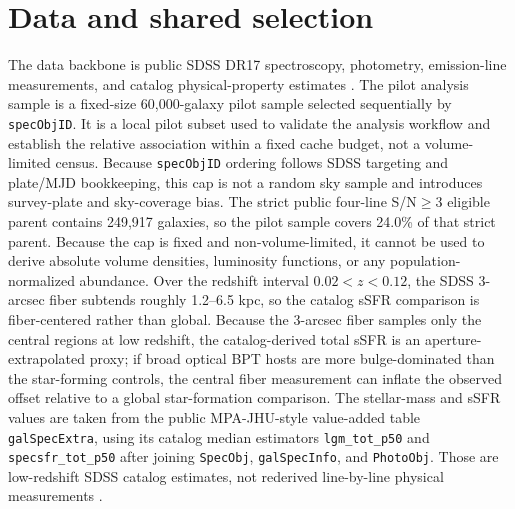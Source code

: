 \documentclass[twocolumn]{aastex631}
\begin{document}
\section{Data and shared selection}
The data backbone is public SDSS DR17 spectroscopy, photometry, emission-line measurements, and catalog physical-property estimates \citep{york2000,sdssdr17,brinchmann2004}. The pilot analysis sample is a fixed-size 60,000-galaxy pilot sample selected sequentially by \texttt{specObjID}. It is a local pilot subset used to validate the analysis workflow and establish the relative association within a fixed cache budget, not a volume-limited census. Because \texttt{specObjID} ordering follows SDSS targeting and plate/MJD bookkeeping, this cap is not a random sky sample and introduces survey-plate and sky-coverage bias. The strict public four-line S/N$\geq3$ eligible parent contains 249,917 galaxies, so the pilot sample covers 24.0\% of that strict parent. Because the cap is fixed and non-volume-limited, it cannot be used to derive absolute volume densities, luminosity functions, or any population-normalized abundance.
Over the redshift interval $0.02<z<0.12$, the SDSS 3-arcsec fiber subtends roughly 1.2--6.5 kpc, so the catalog sSFR comparison is fiber-centered rather than global.
Because the 3-arcsec fiber samples only the central regions at low redshift, the catalog-derived total sSFR is an aperture-extrapolated proxy; if broad optical BPT hosts are more bulge-dominated than the star-forming controls, the central fiber measurement can inflate the observed offset relative to a global star-formation comparison.
The stellar-mass and sSFR values are taken from the public MPA-JHU-style value-added table \texttt{galSpecExtra}, using its catalog median estimators \texttt{lgm\_tot\_p50} and \texttt{specsfr\_tot\_p50} after joining \texttt{SpecObj}, \texttt{galSpecInfo}, and \texttt{PhotoObj}. Those are low-redshift SDSS catalog estimates, not rederived line-by-line physical measurements \citep{brinchmann2004,sdssdr17,york2000}.
\end{document}
